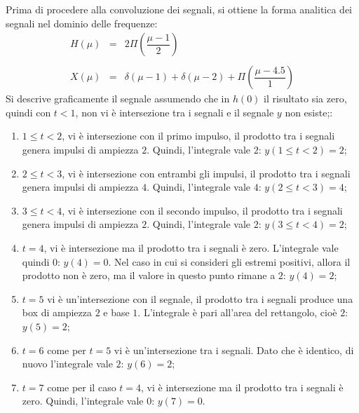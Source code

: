 \documentclass[a4paper]{article}
\begin{document}
	Prima di procedere alla convoluzione dei segnali, si ottiene la forma analitica dei segnali nel dominio delle frequenze:
	\begin{equation*}
		\begin{array}{lll}
			H\left(\mu\right) & = & 2\Pi\left(\dfrac{\mu - 1}{2}\right) \\
			\\
			X\left(\mu\right) & = & \delta\left(\mu - 1\right) + \delta\left(\mu - 2\right) + \Pi\left(\dfrac{\mu - 4.5}{1}\right)
		\end{array}
	\end{equation*}
	Si descrive graficamente il segnale assumendo che in $h\left(0\right)$ il risultato sia zero, quindi con $t < 1$, non vi è intersezione tra i segnali e il segnale $y$ non esiste;:
	\begin{enumerate}[label=\alph*)]
		\item $1 \le t < 2$, vi è intersezione con il primo impulso, il prodotto tra i segnali genera impulsi di ampiezza $2$. Quindi, l'integrale vale $2$: $y\left(1 \le t < 2\right) = 2$;
		
		\item $2 \le t < 3$, vi è intersezione con entrambi gli impulsi, il prodotto tra i segnali genera impulsi di ampiezza $4$. Quindi, l'integrale vale $4$: $y\left(2 \le t < 3\right) = 4$;
		
		\item $3 \le t < 4$, vi è intersezione con il secondo impulso, il prodotto tra i segnali genera impulsi di ampiezza $2$. Quindi, l'integrale vale $2$: $y\left(3 \le t < 4\right) = 2$;
		
		\item $t = 4$, vi è intersezione ma il prodotto tra i segnali è zero. L'integrale vale quindi $0$: $y\left(4\right) = 0$. Nel caso in cui si consideri gli estremi positivi, allora il prodotto non è zero, ma il valore in questo punto rimane a $2$: $y\left(4\right) = 2$;
		
		\item $t = 5$ vi è un'intersezione con il segnale, il prodotto tra i segnali produce una box di ampiezza $2$ e base $1$. L'integrale è pari all'area del rettangolo, cioè $2$: $y\left(5\right)=2$;
		
		\item $t = 6$ come per $t = 5$ vi è un'intersezione tra i segnali. Dato che è identico, di nuovo l'integrale vale $2$: $y\left(6\right)=2$;
		
		\item $t = 7$ come per il caso $t = 4$, vi è intersezione ma il prodotto tra i segnali è zero. Quindi, l'integrale vale $0$: $y\left(7\right) = 0$.
	\end{enumerate}
\end{document}
